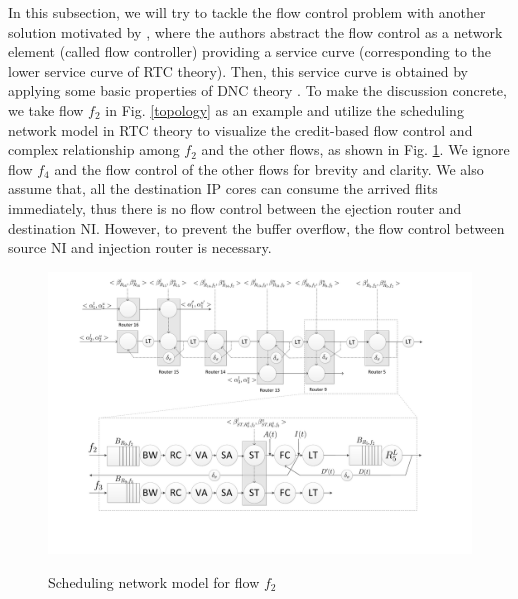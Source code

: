 \documentclass[10pt,journal]{IEEEtran}
\begin{document}
In this subsection, we will try to tackle the flow control problem with another solution motivated by \cite{qian2009analysis}, where the authors abstract the flow control as a network element (called flow controller) providing a service curve (corresponding to the lower service curve of RTC theory). Then, this service curve is obtained by applying some basic properties of DNC theory \cite{Boudec2001Network}. To make the discussion concrete, we take flow $f_2$ in Fig. \ref{topology} as an example and utilize the scheduling network model \cite{1253607} in RTC theory to visualize the credit-based flow control and complex relationship among $f_2$ and the other flows, as shown in Fig. \ref{f2}. We ignore flow $f_4$ and the flow control of the other flows for brevity and clarity. We also assume that, all the destination IP cores can consume the arrived flits immediately, thus there is no flow control between the ejection router and destination NI. However, to prevent the buffer overflow, the flow control between source NI and injection router is necessary.
\begin{figure}
  \centering
  \includegraphics[scale=0.4]{figures/f2.pdf}\\
  \caption{Scheduling network model for flow $f_2$}\label{f2}
\end{figure}
\end{document}
